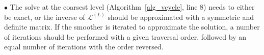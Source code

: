 \noindent$\bullet$ The solve at the coarsest level (Algorithm~\ref{alg_vcycle}, line 8) needs to either be exact, or the inverse of $\mathcal{L}^{(L)}$ should be approximated with a symmetric and
  definite matrix. If the smoother is iterated to approximate the solution, a number of iterations should be performed with a given traversal order, followed by an equal number of
  iterations with the order reversed.



